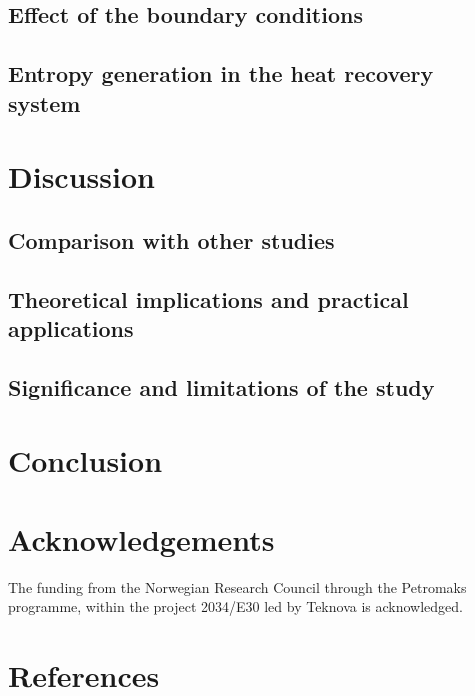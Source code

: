 \documentclass[final,times,3p]{elsarticle}
\begin{document}
\subsection{Effect of the boundary conditions}

\subsection{Entropy generation in the heat recovery system}


\section{Discussion}
\label{sec:discussion}

	\subsection{Comparison with other studies}

	\subsection{Theoretical implications and practical applications}


	
	\subsection{Significance and limitations of the study}


\section{Conclusion}
\label{sec:conclusion}
			

\section*{Acknowledgements}
The funding from the Norwegian Research Council through the Petromaks programme, within the project 2034/E30 led by Teknova is acknowledged. 


\appendix



\section*{References}
\label{References}



			
\end{document}
